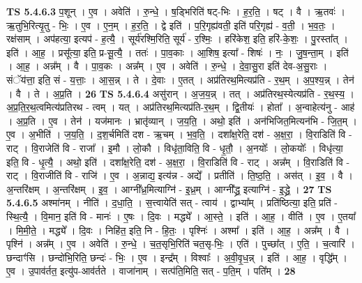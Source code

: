 \documentclass[17pt]{extarticle}
\begin{document}
                  \newline
                                \textbf{ TS 5.4.6.3} \newline
                  प॒शून् । ए॒व । अवेति॑ । रु॒न्धे॒ । ष॒ड्भिरिति॑ षट्-भिः । ह॒र॒ति॒ । षट् । वै । ऋ॒तवः॑ । ऋ॒तुभि॒रित्यृ॒तु - भिः॒ । ए॒व । ए॒न॒म् । ह॒र॒ति॒ । द्वे इति॑ । प॒रि॒गृह्य॑वती॒ इति॑ परि॒गृह्य॑ - व॒ती॒ । भ॒व॒तः॒ । रक्ष॑साम् । अप॑हत्या॒ इत्यप॑ - ह॒त्यै॒ । सूर्य॑रश्मि॒रिति॒ सूर्य॑ - र॒श्मिः॒ । हरि॑केश॒ इति॒ हरि॑-के॒शः॒ । पु॒रस्ता᳚त् । इति॑ । आ॒ह॒ । प्रसू᳚त्या॒ इति॒ प्र-सू॒त्यै॒ । ततः॑ । पा॒व॒काः । आ॒शिष॒ इत्या᳚ - शिषः॑ । नः॒ । जु॒ष॒न्ता॒म् । इति॑ । आ॒ह॒ । अन्न᳚म् । वै । पा॒व॒कः । अन्न᳚म् । ए॒व । अवेति॑ । रु॒न्धे॒ । दे॒वा॒सु॒रा इति॑ देव-अ॒सु॒राः । संॅय॑त्ता॒ इति॒ सं - य॒त्ताः॒ । आ॒स॒न्न् । ते । दे॒वाः । ए॒तत् । अप्र॑तिरथ॒मित्यप्र॑ति - र॒थ॒म् । अ॒प॒श्य॒न्न् । तेन॑ । वै । ते । अ॒प्र॒ति । \textbf{  26} \newline
                  \newline
                                \textbf{ TS 5.4.6.4} \newline
                  असु॑रान् । अ॒ज॒य॒न्न् । तत् । अप्र॑तिरथ॒स्येत्यप्र॑ति - र॒थ॒स्य॒ । अ॒प्र॒ति॒र॒थ॒त्वमित्य॑प्रतिरथ - त्वम् । यत् । अप्र॑तिरथ॒मित्यप्र॑ति-र॒थ॒म् । द्वि॒तीयः॑ । होता᳚ । अ॒न्वाहेत्य॑नु - आह॑ । अ॒प्र॒ति । ए॒व । तेन॑ । यज॑मानः । भ्रातृ॑व्यान् । ज॒य॒ति॒ । अथो॒ इति॑ । अन॑भिजित॒मित्यन॑भि - जि॒त॒म् । ए॒व । अ॒भीति॑ । ज॒य॒ति॒ । द॒श॒र्चमिति॑ दश - ऋ॒चम् । भ॒व॒ति॒ । दशा᳚क्ष॒रेति॒ दश॑ - अ॒क्ष॒रा॒ । वि॒राडिति॑ वि - राट् । वि॒राजेति॑ वि - राजा᳚ । इ॒मौ । लो॒कौ । विधृ॑ता॒विति॒ वि - धृ॒तौ॒ । अ॒नयोः᳚ । लो॒कयोः᳚ । विधृ॑त्या॒ इति॒ वि - धृ॒त्यै॒ । अथो॒ इति॑ । दशा᳚क्ष॒रेति॒ दश॑ - अ॒क्ष॒रा॒ । वि॒राडिति॑ वि - राट् । अन्न᳚म् । वि॒राडिति॑ वि - राट् । वि॒राजीति॑ वि - राजि॑ । ए॒व । अ॒न्नाद्य॒ इत्य॑न्न - अद्ये᳚ । प्रतीति॑ । ति॒ष्ठ॒ति॒ । अस॑त् । इ॒व॒ । वै । अ॒न्तरि॑क्षम् । अ॒न्तरि॑क्षम् । इ॒व॒ । आग्नी᳚ध्र॒मित्याग्नि॑ - इ॒ध्र॒म् । आग्नी᳚द्ध्र॒ इत्याग्नि॑ - इ॒द्ध्रे॒ । \textbf{  27} \newline
                  \newline
                                \textbf{ TS 5.4.6.5} \newline
                  अश्मा॑नम् । नीति॑ । द॒धा॒ति॒ । स॒त्त्वायेति॑ सत् - त्वाय॑ । द्वाभ्या᳚म् । प्रति॑ष्ठित्या॒ इति॒ प्रति॑ - स्थि॒त्यै॒ । वि॒मान॒ इति॑ वि - मानः॑ । ए॒षः । दि॒वः । मद्ध्ये᳚ । आ॒स्ते॒ । इति॑ । आ॒ह॒ । वीति॑ । ए॒व । ए॒तया᳚ । मि॒मी॒ते॒ । मद्ध्ये᳚ । दि॒वः । निहि॑त॒ इति॒ नि - हि॒तः॒ । पृश्निः॑ । अश्मा᳚ । इति॑ । आ॒ह॒ । अन्न᳚म् । वै । पृश्नि॑ । अन्न᳚म् । ए॒व । अवेति॑ । रु॒न्धे॒ । च॒त॒सृभि॒रिति॑ चत॒सृ-भिः॒ । एति॑ । पुच्छा᳚त् । ए॒ति॒ । च॒त्वारि॑ । छन्दाꣳ॑सि । छन्दो॑भि॒रिति॒ छन्दः॑ - भिः॒ । ए॒व । इन्द्र᳚म् । विश्वाः᳚ । अ॒वी॒वृ॒ध॒न्न् । इति॑ । आ॒ह॒ । वृद्धि᳚म् । ए॒व । उ॒पाव॑र्तत॒ इत्यु॑प-आव॑र्तते । वाजा॑नाम् । सत्प॑ति॒मिति॒ सत् - प॒ति॒म् । पति᳚म् । \textbf{  28} \newline
\end{document}
